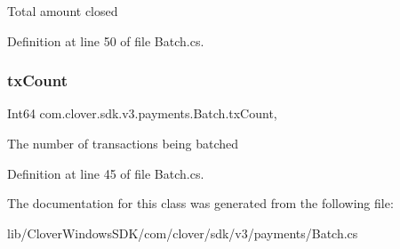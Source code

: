 Total amount closed 



Definition at line 50 of file Batch.\+cs.

\mbox{\label{classcom_1_1clover_1_1sdk_1_1v3_1_1payments_1_1_batch_a787364af27ddf1d31e92a4c1b47c9fad}} 
\subsubsection{\texorpdfstring{tx\+Count}{txCount}}
{\footnotesize\ttfamily Int64 com.\+clover.\+sdk.\+v3.\+payments.\+Batch.\+tx\+Count\hspace{0.3cm}{\ttfamily [get]}, {\ttfamily [set]}}



The number of transactions being batched 



Definition at line 45 of file Batch.\+cs.



The documentation for this class was generated from the following file\+:\begin{DoxyCompactItemize}
\item 
lib/\+Clover\+Windows\+S\+D\+K/com/clover/sdk/v3/payments/Batch.\+cs\end{DoxyCompactItemize}
